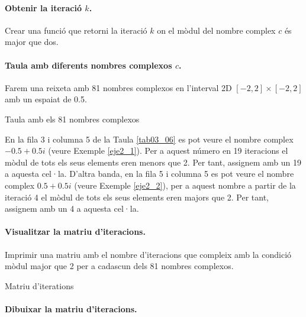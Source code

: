\documentclass[12pt,a4paper]{report}
\begin{document}
\paragraph*{Obtenir la iteració $k$.} Crear una funció que retorni la iteració $k$ on el mòdul del nombre complex $c$ és major que dos.
{
}

\paragraph*{Taula amb diferents nombres complexos $c$.} Farem una reixeta amb 81 nombres complexos en l'interval 2D $[-2,2]\times[-2,2]$ amb un espaiat de 0.5.
{
}

\begin{table}[!ht]
{}
\caption{Taula amb els 81 nombres complexos}
\label{tab03_06}
\end{table}

En la fila 3 i columna 5 de la Taula \ref{tab03_06} es pot veure el nombre complex $ -0.5 + 0.5i$ (veure Exemple \ref{eje2_1}). Per a aquest número en 19 iteracions el mòdul de tots els seus elements eren menors que 2. Per tant, assignem amb un 19 a aquesta cel·la. D'altra banda, en la fila 5 i columna 5 es pot veure el nombre complex $ 0.5 + 0.5i$ (veure Exemple \ref{eje2_2}), per a aquest nombre a partir de la iteració 4 el mòdul de tots els seus elements eren majors que 2. Per tant, assignem amb un 4 a aquesta cel·la.

\paragraph*{Visualitzar la matriu d’iteracions.} Imprimir una matriu amb el nombre d'iteracions que compleix amb la condició mòdul major que 2 per a cadascun dels 81 nombres complexos.
{
}
\begin{table}[!ht]
\centering
{}
\caption{Matriu d'iterations}
\end{table}

\paragraph*{ Dibuixar la matriu d'iteracions.}\hspace*{0px}
{
}
\end{document}
